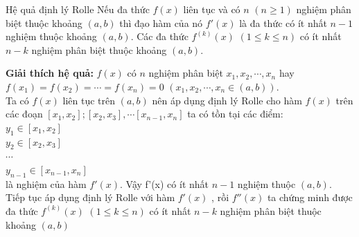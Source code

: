 \begin{frame}

 \begin{block}{Hệ quả định lý Rolle}
 Nếu đa thức $f(x)$ liên tục và có $n$ $(n\ge 1)$ nghiệm phân biệt thuộc khoảng $(a,b)$ thì đạo hàm của nó $f'(x)$ là đa thức có ít nhất $n-1$ nghiệm thuộc khoảng $(a,b)$. Các đa thức $f^{(k)}(x)$ $(1 \le k\le n)$ có ít nhất $n-k$ nghiệm phân biệt thuộc khoảng $(a,b)$.
 \end{block}
 \pause
 \textbf{Giải thích hệ quả:} $f(x)$ có $n$ nghiệm phân biệt $x_1,x_2,\cdots ,x_n$ hay $f(x_1)=f(x_2)=\cdots=f(x_n)=0$ $(x_1,x_2,\cdots, x_n \in (a,b))$.\\
 \pause
 Ta có $f(x)$ liên tục trên $(a,b)$ nên áp dụng định lý Rolle cho hàm $f(x)$ trên các đoạn $[x_1,x_2];[x_2, x_3],\cdots[x_{n-1}, x_n]$ ta có tồn tại các điểm:\\
 \pause 
 $y_1\in \left[x_1,x_2\right]$\\
  $y_2\in \left[x_2,x_3\right]$\\
  $\cdots$\\
   $y_{n-1}\in \left[x_{n-1},x_n\right]$\\
   là nghiệm của hàm $f'(x)$. Vậy f'(x) có ít nhất $n-1$ nghiệm thuộc $(a,b)$.\\
   \pause 
   Tiếp tục áp dụng định lý Rolle với hàm $f'(x)$ , rồi $f''(x)$ ta chứng minh được đa thức $f^{(k)}(x)$ $(1 \le k\le n)$ có ít nhất $n-k$ nghiệm phân biệt thuộc khoảng $(a,b)$
\end{frame}


